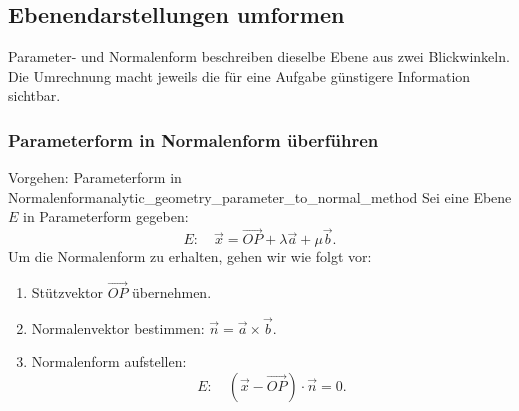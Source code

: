 \subsection{Ebenendarstellungen umformen}
\label{subsec:analytic_geometry_converting_plane_representations}

Parameter- und Normalenform beschreiben dieselbe Ebene aus zwei Blickwinkeln.
Die Umrechnung macht jeweils die für eine Aufgabe günstigere Information
sichtbar.

\begin{center}
\end{center}

\subsubsection{Parameterform in Normalenform überführen}

\begin{KeyPointBox}{Vorgehen: Parameterform in Normalenform}{analytic_geometry_parameter_to_normal_method}
    Sei eine Ebene $E$ in Parameterform gegeben:
    \[
      E:\quad
      \vec x=\overrightarrow{OP}+\lambda\vec a+\mu\vec b.
    \]
    Um die Normalenform zu erhalten, gehen wir wie folgt vor:
    \begin{enumerate}[leftmargin=1.6em,itemsep=0.25em]
      \item Stützvektor $\overrightarrow{OP}$ übernehmen.
      \item Normalenvektor bestimmen: $\vec n=\vec a\times\vec b$.
      \item Normalenform aufstellen:
      \[
      E:\quad (\vec x-\overrightarrow{OP})\cdot\vec n=0.
    \]
    \end{enumerate}
\end{KeyPointBox}

